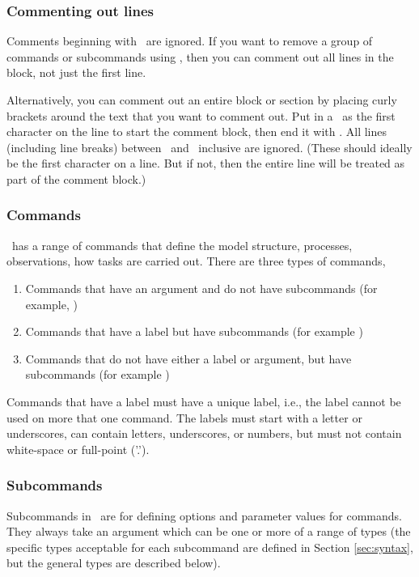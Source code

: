 \subsubsection{Commenting out lines}

Comments beginning with \commentline\ are ignored. If you want to remove a group of commands or subcommands using \commentline, then you can comment out all lines in the block, not just the first line. 

Alternatively, you can comment out an entire block or section by placing curly brackets around the text that you want to comment out. Put in a \commentstart\ as the first character on the line to start the comment block, then end it with \commentend. All lines (including line breaks) between \commentstart\ and \commentend\ inclusive are ignored. (These should ideally be the first character on a line. But if not, then the entire line will be treated as part of the comment block.)

\subsubsection{Commands}

\SPM\ has a range of commands that define the model structure, processes, observations, how tasks are carried out. There are three types of commands, 
\begin{enumerate}
\item Commands that have an argument and do not have subcommands (for example, )
\item Commands that have a label but have subcommands (for example )
\item Commands that do not have either a label or argument, but have subcommands (for example )
\end{enumerate}

Commands that have a label must have a unique label, i.e., the label cannot be used on more that one command. The labels must start with a letter or underscores, can contain letters, underscores, or numbers, but must not contain white-space or full-point ('.').

\subsubsection{Subcommands}

Subcommands in \SPM\ are for defining options and parameter values for commands. They always take an argument which can be one or more of a range of types (the specific types acceptable for each subcommand are defined in Section \ref{sec:syntax}, but the general types are described below). 

